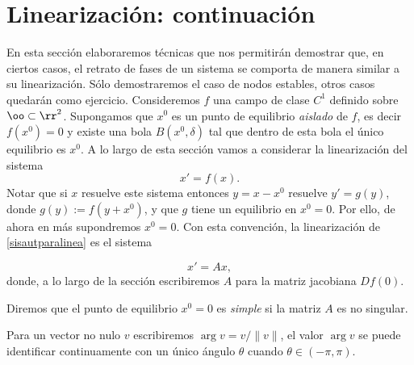 \section{Linearización: continuación}
En esta sección elaboraremos técnicas que nos permitirán demostrar
que, en ciertos casos, el retrato de fases de un sistema se
comporta de manera similar a su linearización. Sólo demostraremos
el caso de nodos estables, otros casos quedarán como ejercicio.
Consideremos $f$ una campo de clase $C^1$ definido sobre
$\oo\subset\rr^2$. Supongamos que $x^0$ es un punto de equilibrio
\emph{aislado} de $f$, es decir $f(x^0)=0$ y existe una bola
$B(x^0,\delta)$ tal que dentro de esta bola el único equilibrio es
$x^0$. A lo largo de esta sección vamos a considerar la
linearización del sistema
\begin{equation}\label{sisautparalinea}
    x'=f(x).
\end{equation}
Notar que si $x$ resuelve este sistema entonces $y=x-x^0$ resuelve
$y'=g(y)$, donde $g(y):=f(y+x^0)$, y que $g$ tiene un equilibrio
en $x^0=0$. Por ello, de ahora en más supondremos $x^0=0$. Con
esta convención, la linearización de \eqref{sisautparalinea} es el
sistema


\begin{equation}\label{sisautparalineab}
    x'=Ax,
\end{equation}
donde, a lo largo de la sección escribiremos $A$ para la matriz
jacobiana $Df(0)$.


\begin{definicion} Diremos que el punto de equilibrio $x^0=0$ es
\emph{simple} si la matriz $A$ es no singular.
\end{definicion}

Para un vector no nulo $v$ escribiremos $\arg v=v/\|v\|$, el valor
$\arg v$ se puede identificar continuamente con un único ángulo
$\theta$ cuando $\theta\in (-\pi,\pi)$.

